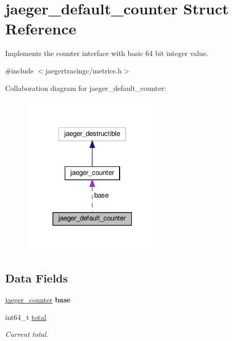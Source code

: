 \hypertarget{structjaeger__default__counter}{}\section{jaeger\+\_\+default\+\_\+counter Struct Reference}
\label{structjaeger__default__counter}


Implements the counter interface with basic 64 bit integer value.  




{\ttfamily \#include $<$jaegertracingc/metrics.\+h$>$}



Collaboration diagram for jaeger\+\_\+default\+\_\+counter\+:\nopagebreak
\begin{figure}[H]
\begin{center}
\leavevmode
\includegraphics[width=195pt]{structjaeger__default__counter__coll__graph}
\end{center}
\end{figure}
\subsection*{Data Fields}
\begin{DoxyCompactItemize}
\item 
\mbox{\label{structjaeger__default__counter_a1b29bf6888032ef2f05ee09fc67bd621}} 
\mbox{\hyperlink{structjaeger__counter}{jaeger\+\_\+counter}} {\bfseries base}
\item 
int64\+\_\+t \mbox{\hyperlink{structjaeger__default__counter_aaa90f254bc0b9720567642d2bb0422e8}{total}}
\begin{DoxyCompactList}\small\item\em Current total. \end{DoxyCompactList}\end{DoxyCompactItemize}


